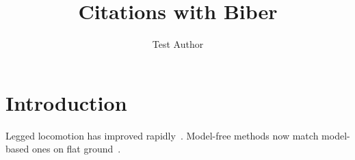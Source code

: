 \documentclass{article}
\title{Citations with Biber}
\author{Test Author}
\begin{document}
\maketitle
\section{Introduction}
Legged locomotion has improved rapidly~\cite{smith2020}. Model-free methods
now match model-based ones on flat ground~\cite{lee2021}.
\printbibliography
\end{document}
